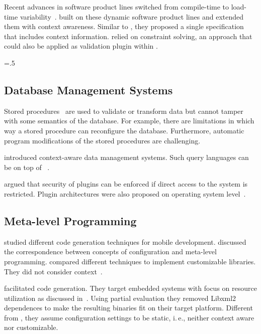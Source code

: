 Recent advances in software product lines switched from compile-time to load-time variability~\cite{rhein2016variability}.
\citet{mauro2016context} built on these dynamic software product lines and extended them with context awareness.
Similar to \elektra{}, they proposed a single specification that includes context information.
\citet{mauro2016context} relied on constraint solving, an approach that could also be applied as validation plugin within \elektra{}.%
{\parfillskip=0pt \emergencystretch=.5\textwidth \par}


\subsection{Database Management Systems}

Stored procedures~\cite{eisenberg1996standard} are used to validate or transform data but cannot tamper with some semantics of the database.
For example, there are limitations in which way a stored procedure can reconfigure the database.
Furthermore, automatic program modifications of the stored procedures are challenging.

\citet{elmongui2009chameleon} introduced context-aware data management systems.
Such query languages can be on top of \elektra{}~\cite{raab2016persistent}.

\citet{grier09how} argued that security of plugins can be enforced if direct access to the system is restricted.
Plugin architectures were also proposed on operating system level~\cite{decasper2000router}.


\subsection{Meta-level Programming}

\citet{umuhoza2015automatic} studied different code generation techniques for mobile development.
\citet{loques2000integration} discussed the correspondence between concepts of configuration and meta-level programming.
\citet{aktemur2009comparative} compared different techniques to implement customizable libraries.
They did not consider context~\cite{raab2016persistent}.


\citet{jung2005embedded} facilitated code generation.
They target embedded systems with focus on resource utilization as discussed in~.
Using partial evaluation they removed Libxml2 dependences to make the resulting binaries fit on their target platform.
Different from \elektra{}, they assume configuration settings to be static, i.\,e., neither context aware nor customizable.

